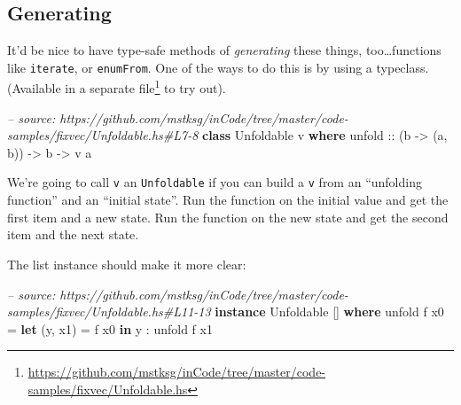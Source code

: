 \documentclass[]{article}
\newenvironment{Shaded}{}{}
\newcommand{\KeywordTok}[1]{\textcolor[rgb]{0.00,0.44,0.13}{\textbf{{#1}}}}
\newcommand{\DataTypeTok}[1]{\textcolor[rgb]{0.56,0.13,0.00}{{#1}}}
\newcommand{\DecValTok}[1]{\textcolor[rgb]{0.25,0.63,0.44}{{#1}}}
\newcommand{\CommentTok}[1]{\textcolor[rgb]{0.38,0.63,0.69}{\textit{{#1}}}}
\newcommand{\OtherTok}[1]{\textcolor[rgb]{0.00,0.44,0.13}{{#1}}}
\newcommand{\FunctionTok}[1]{\textcolor[rgb]{0.02,0.16,0.49}{{#1}}}
\newcommand{\NormalTok}[1]{{#1}}
\renewcommand{\href}[2]{#2\footnote{\url{#1}}}
\begin{document}
\subsection{Generating}\label{generating}

It'd be nice to have type-safe methods of \emph{generating} these things,
too\ldots{}functions like \texttt{iterate}, or \texttt{enumFrom}. One of the
ways to do this is by using a typeclass. (Available in a
\href{https://github.com/mstksg/inCode/tree/master/code-samples/fixvec/Unfoldable.hs}{separate
file} to try out).

\begin{Shaded}
\begin{Highlighting}[]
\CommentTok{-- source: https://github.com/mstksg/inCode/tree/master/code-samples/fixvec/Unfoldable.hs#L7-8}
\KeywordTok{class} \DataTypeTok{Unfoldable} \NormalTok{v }\KeywordTok{where}
\OtherTok{    unfold ::} \NormalTok{(b }\OtherTok{->} \NormalTok{(a, b)) }\OtherTok{->} \NormalTok{b }\OtherTok{->} \NormalTok{v a}
\end{Highlighting}
\end{Shaded}

We're going to call \texttt{v} an \texttt{Unfoldable} if you can build a
\texttt{v} from an ``unfolding function'' and an ``initial state''. Run the
function on the initial value and get the first item and a new state. Run the
function on the new state and get the second item and the next state.

The list instance should make it more clear:

\begin{Shaded}
\begin{Highlighting}[]
\CommentTok{-- source: https://github.com/mstksg/inCode/tree/master/code-samples/fixvec/Unfoldable.hs#L11-13}
\KeywordTok{instance} \DataTypeTok{Unfoldable} \NormalTok{[] }\KeywordTok{where}
    \NormalTok{unfold f x0 }\FunctionTok{=} \KeywordTok{let} \NormalTok{(y, x1) }\FunctionTok{=} \NormalTok{f x0}
                  \KeywordTok{in}  \NormalTok{y }\FunctionTok{:} \NormalTok{unfold f x1}
\end{Highlighting}
\end{Shaded}

\begin{Shaded}
\end{Shaded}
\end{document}
